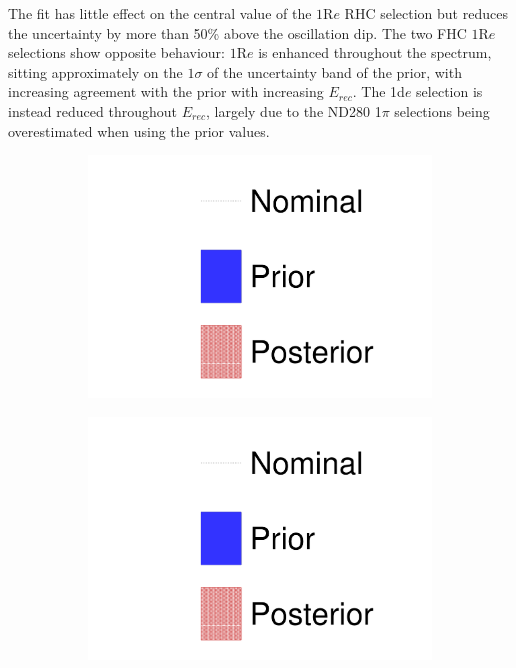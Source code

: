 The fit has little effect on the central value of the $1\text{R}e$ RHC selection but reduces the uncertainty by more than 50\% above the oscillation dip. The two FHC $1\text{R}e$ selections show opposite behaviour: $1\text{R}e$ is enhanced throughout the spectrum, sitting approximately on the $1\sigma$ of the uncertainty band of the prior, with increasing agreement with the prior with increasing $E_{rec}$. The 1d$e$ selection is instead reduced throughout $E_{rec}$, largely due to the ND280 1$\pi$ selections being overestimated when using the prior values.
\begin{figure}[h]
	\begin{subfigure}[t]{0.32\textwidth}
		\includegraphics[width=\textwidth, trim={0mm 0mm 0mm 0mm}, clip, page=1]{figures/mach3/data/prior_error_1june_try_2017_fit_on_sk_spectra}
	\end{subfigure}
	\begin{subfigure}[t]{0.32\textwidth}
		\includegraphics[width=\textwidth, trim={0mm 0mm 0mm 0mm}, clip, page=5]{figures/mach3/data/prior_error_1june_try_2017_fit_on_sk_spectra}

\end{subfigure}
\end{figure}
